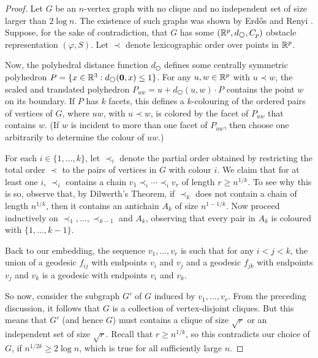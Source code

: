 \documentclass{patmorin}
\begin{document}
\begin{proof}
  Let $G$ be an $n$-vertex graph with no clique and no independent set of
  size larger than $2\log n$. The existence of such graphs was shown by
  Erd\H{o}s and Renyi \cite{X}. Suppose, for the sake of contradiction,
  that $G$ has some $(\R^p, d_{\hexagon}, C_p)$ obstacle representation
  $(\varphi,S)$. Let $\prec$ denote lexicographic order over points
  in $\mathbb{R}^{p}$.

  Now, the polyhedral distance function $d_{\hexagon}$
  defines some centrally symmetric polyhedron
  $P=\{x\in\R^3:d_{\hexagon}(\mathbf{0},x)\le 1\}$.  For any $u,w\in
  \mathbb{R}^p$ with $u\prec w$, the scaled and translated polyhedron
  $P_{uw}=u+d_{\hexagon}(u,w)\cdot P$ contains the point $w$ on its
  boundary.  If $P$ has $k$ facets, this defines a $k$-colouring of
  the ordered pairs of vertices of $G$, where $uw$, with $u\prec w$,
  is colored by the facet of $P_{uw}$ that contains $w$.  (If $w$
  is incident to more than one facet of $P_{uw}$, then choose one
  arbitrarily to determine the colour of $uw$.)

  For each $i\in\{1,\ldots,k\}$, let $\prec_i$ denote the partial
  order obtained by restricting the total order $\prec$ to the pairs of
  vertices in $G$ with colour $i$.  We claim that for at least one $i$,
  $\prec_i$ contains a chain $v_1\prec_i\cdots\prec_i v_r$ of length
  $r\ge n^{1/k}$.  To see why this is so, observe that, by Dilwerth's
  Theorem, if $\prec_k$ does not contain a chain of length $n^{1/k}$,
  then it contains an antichain $A_k$ of size $n^{1-1/k}$.  Now proceed
  inductively on $\prec_1,\ldots,\prec_{k-1}$ and $A_k$, observing that
  every pair in $A_k$ is coloured with $\{1,\ldots,k-1\}$.

  Back to our embedding, the sequence $v_1,\ldots,v_r$ is such that for
  any $i<j<k$, the union of a geodesic $f_{ij}$ with endpoints $v_i$
  and $v_j$ and a geodesic $f_{jk}$ with endpoints $v_j$ and $v_k$
  is a geodesic with endpoints $v_i$ and $v_k$.
  
  So now, consider the subgraph $G'$ of $G$ induced by
  $v_1,\ldots,v_r$. From the preceding discussion, it follows that $G$
  is a collection of vertex-disjoint cliques.  But this means that
  $G'$ (and hence $G$) must contains a clique of size $\sqrt{r}$ or
  an independent set of size $\sqrt{r}$.  Recall that $r\ge
  n^{1/k}$, so this contradicts our choice of $G$, if $n^{1/2k} \ge
  2\log n$, which is true for all sufficiently large $n$.
\end{proof}
\end{document}
